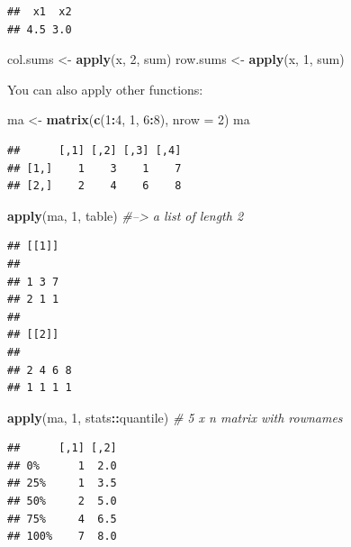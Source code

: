 \documentclass[12pt,]{krantz}
\newenvironment{Shaded}{\begin{snugshade}}{\end{snugshade}}
\newcommand{\KeywordTok}[1]{\textcolor[rgb]{0.13,0.29,0.53}{\textbf{#1}}}
\newcommand{\DataTypeTok}[1]{\textcolor[rgb]{0.13,0.29,0.53}{#1}}
\newcommand{\DecValTok}[1]{\textcolor[rgb]{0.00,0.00,0.81}{#1}}
\newcommand{\StringTok}[1]{\textcolor[rgb]{0.31,0.60,0.02}{#1}}
\newcommand{\CommentTok}[1]{\textcolor[rgb]{0.56,0.35,0.01}{\textit{#1}}}
\newcommand{\OperatorTok}[1]{\textcolor[rgb]{0.81,0.36,0.00}{\textbf{#1}}}
\newcommand{\NormalTok}[1]{#1}
\theoremstyle{definition}
\theoremstyle{definition}
\theoremstyle{definition}
\theoremstyle{remark}
\begin{document}
\begin{verbatim}
##  x1  x2 
## 4.5 3.0
\end{verbatim}

\begin{Shaded}
\begin{Highlighting}[]
\NormalTok{col.sums <-}\StringTok{ }\KeywordTok{apply}\NormalTok{(x, }\DecValTok{2}\NormalTok{, sum)}
\NormalTok{row.sums <-}\StringTok{ }\KeywordTok{apply}\NormalTok{(x, }\DecValTok{1}\NormalTok{, sum)}
\end{Highlighting}
\end{Shaded}

You can also apply other functions:

\begin{Shaded}
\begin{Highlighting}[]
\NormalTok{ma <-}\StringTok{ }\KeywordTok{matrix}\NormalTok{(}\KeywordTok{c}\NormalTok{(}\DecValTok{1}\OperatorTok{:}\DecValTok{4}\NormalTok{, }\DecValTok{1}\NormalTok{, }\DecValTok{6}\OperatorTok{:}\DecValTok{8}\NormalTok{), }\DataTypeTok{nrow =} \DecValTok{2}\NormalTok{)}
\NormalTok{ma}
\end{Highlighting}
\end{Shaded}

\begin{verbatim}
##      [,1] [,2] [,3] [,4]
## [1,]    1    3    1    7
## [2,]    2    4    6    8
\end{verbatim}

\begin{Shaded}
\begin{Highlighting}[]
\KeywordTok{apply}\NormalTok{(ma, }\DecValTok{1}\NormalTok{, table)  }\CommentTok{#--> a list of length 2}
\end{Highlighting}
\end{Shaded}

\begin{verbatim}
## [[1]]
## 
## 1 3 7 
## 2 1 1 
## 
## [[2]]
## 
## 2 4 6 8 
## 1 1 1 1
\end{verbatim}

\begin{Shaded}
\begin{Highlighting}[]
\KeywordTok{apply}\NormalTok{(ma, }\DecValTok{1}\NormalTok{, stats}\OperatorTok{::}\NormalTok{quantile) }\CommentTok{# 5 x n matrix with rownames}
\end{Highlighting}
\end{Shaded}

\begin{verbatim}
##      [,1] [,2]
## 0%      1  2.0
## 25%     1  3.5
## 50%     2  5.0
## 75%     4  6.5
## 100%    7  8.0
\end{verbatim}
\end{document}
